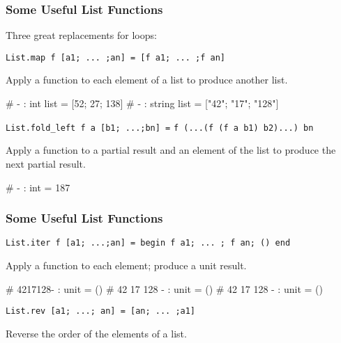 \documentclass{plt}
\begin{document}
\begin{frame}[fragile]
  \frametitle{Some Useful List Functions}

Three great replacements for loops:

\verb|List.map f [a1; ... ;an] = [f a1; ... ;f an]|

Apply a function to each element of a list to produce another list.

\begin{interactive}
# 
- : int list = [52; 27; 138]
# 
- : string list = ["42"; "17"; "128"]
\end{interactive}
\verb|List.fold_left f a [b1; ...;bn] =| \verb|f (...(f (f a b1) b2)...) bn|

Apply a function to a partial result and an element of the list to
produce the next partial result.

\begin{interactive}
# 
- : int = 187
\end{interactive}

\end{frame}

\begin{frame}[fragile]
  \frametitle{Some Useful List Functions}


\verb|List.iter f [a1; ...;an] = begin f a1; ... ; f an; () end|

Apply a function to each element; produce a unit result.


\begin{interactive}
# 
4217128- : unit = ()
# 
42
17
128
- : unit = ()
# 
42
17
128
- : unit = ()
\end{interactive}
\verb|List.rev [a1; ...; an] = [an; ... ;a1]|

Reverse the order of the elements of a list.

\end{frame}
\end{document}
